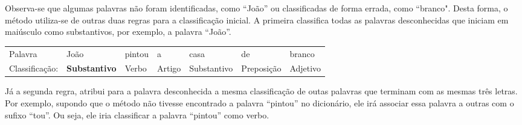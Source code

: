 Observa-se que algumas palavras não foram
identificadas, como ``João'' ou classificadas de forma errada, como
``branco". Desta forma, o método utiliza-se de outras duas regras para a
classificação inicial.
A primeira classifica todas as palavras desconhecidas que iniciam em maiúsculo como substantivos, por exemplo, a palavra ``João''.

\begin{table}[htb]
\centering
\begin{tabular}{l|l|l|l|l|l|l}
Palavra         & João        & pintou & a      & casa        & de        
& branco
         \\
Classificação:   & \textbf{Substantivo} & Verbo  & Artigo & Substantivo &
Preposição & Adjetivo
\end{tabular}
\label{my-label}
\end{table}

Já a segunda regra, atribui para a palavra desconhecida a mesma classificação
de outas palavras que terminam com as mesmas três letras. Por exemplo, supondo que o
método não tivesse encontrado a palavra ``pintou'' no dicionário, ele irá
associar essa palavra a outras com o sufixo ``tou''. Ou seja, ele iria
classificar a palavra ``pintou'' como verbo.

